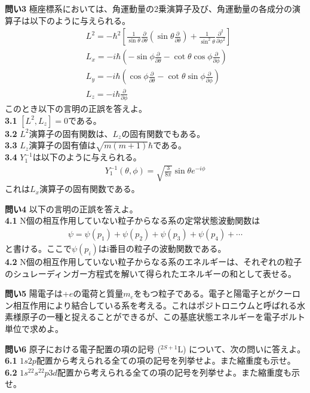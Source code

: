 \documentclass[11pt,pra,aps]{revtex4}
\begin{document}
\noindent
{\bf 問い3} 極座標系においては、角運動量の2乗演算子及び、角運動量の各成分の演算子は以下のように与えられる。
\begin{align}
  &L^2 = -\hbar^2\left[\frac{1}{\sin\theta}\frac{\partial}{\partial\theta}\left(\sin\theta\frac{\partial}{\partial\theta}\right)+\frac{1}{\sin^2\theta}\frac{\partial^2}{\partial\phi^2}\right]\\
  &L_x = -i\hbar\left(-\sin\phi\frac{\partial}{\partial \theta}-\cot\theta\cos\phi\frac{\partial}{\partial\phi}\right)\\
  &L_y = -i\hbar\left(\cos\phi\frac{\partial}{\partial \theta}-\cot\theta\sin\phi\frac{\partial}{\partial\phi}\right)\\    
  &L_z = -i\hbar\frac{\partial}{\partial \phi}
\end{align}
このとき以下の言明の正誤を答えよ。\\
\noindent
{\bf 3.1} $[L^2,L_z]=0$である。\\
\noindent    
{\bf 3.2} $L^2$演算子の固有関数は、$L_z$の固有関数でもある。\\
\noindent        
{\bf 3.3} $L_z$演算子の固有値は$\sqrt{m(m+1)}\hbar$である。\\
\noindent
{\bf 3.4} $Y^{-1}_1$は以下のように与えられる。
\begin{align}
  Y^{-1}_1(\theta,\phi)=\sqrt{\frac{3}{8\pi}}\sin\theta e^{-i\phi}
\end{align}
これは$L_x$演算子の固有関数である。

\noindent
{\bf 問い4} 以下の言明の正誤を答えよ。\\
\noindent
{\bf 4.1} N個の相互作用していない粒子からなる系の定常状態波動関数は
\begin{align}
  \psi = \psi(p_1) + \psi(p_2) + \psi(p_3) + \psi(p_4) + \cdots
\end{align}
と書ける。ここで$\psi(p_i)$はi番目の粒子の波動関数である。\\
\noindent
{\bf 4.2} N個の相互作用していない粒子からなる系のエネルギーは、それぞれの粒子のシュレーディンガー方程式を解いて得られたエネルギーの和として表せる。

\noindent
{\bf 問い5} 陽電子は+$e$の電荷と質量$m_e$をもつ粒子である。電子と陽電子とがクーロン相互作用により結合している系を考える。これはポジトロニウムと呼ばれる水素様原子の一種と捉えることができるが、この基底状態エネルギーを電子ボルト単位で求めよ。

\noindent
{\bf 問い6} 原子における電子配置の項の記号 (${}^{2S+1}\text{L}$) について、次の問いに答えよ。\\
\noindent
{\bf 6.1} $1s2p$配置から考えられる全ての項の記号を列挙せよ。また縮重度も示せ。\\
\noindent
{\bf 6.2} $1s^22s^22p3d$配置から考えられる全ての項の記号を列挙せよ。また縮重度も示せ。
    
\end{document}
